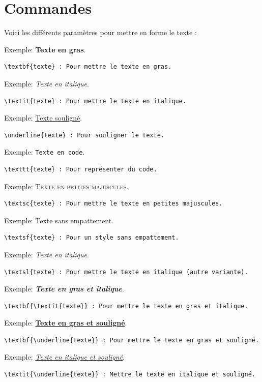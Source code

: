 \chapter{Commandes}


Voici les différents paramètres pour mettre en forme le texte : 

Exemple: \textbf{Texte en gras}.
\begin{verbatim}
\textbf{texte} : Pour mettre le texte en gras.
\end{verbatim}

Exemple: \textit{Texte en italique}.
\begin{verbatim}
\textit{texte} : Pour mettre le texte en italique.
\end{verbatim}

Exemple: \underline{Texte souligné}.
\begin{verbatim}
\underline{texte} : Pour souligner le texte.
\end{verbatim}

Exemple: \texttt{Texte en code}.
\begin{verbatim}
\texttt{texte} : Pour représenter du code.
\end{verbatim}

Exemple: \textsc{Texte en petites majuscules}.
\begin{verbatim}
\textsc{texte} : Pour mettre le texte en petites majuscules.
\end{verbatim}

Exemple: \textsf{Texte sans empattement}.
\begin{verbatim}
\textsf{texte} : Pour un style sans empattement.
\end{verbatim}

Exemple: \textsl{Texte en italique}.
\begin{verbatim}
\textsl{texte} : Pour mettre le texte en italique (autre variante).
\end{verbatim}

Exemple: \textbf{\textit{Texte en gras et italique}}.
\begin{verbatim}
\textbf{\textit{texte}} : Pour mettre le texte en gras et italique.
\end{verbatim}

Exemple: \textbf{\underline{Texte en gras et souligné}}.
\begin{verbatim}
\textbf{\underline{texte}} : Pour mettre le texte en gras et souligné.
\end{verbatim}

Exemple: \textit{\underline{Texte en italique et souligné}}.
\begin{verbatim}
\textit{\underline{texte}} : Mettre le texte en italique et souligné.
\end{verbatim}

